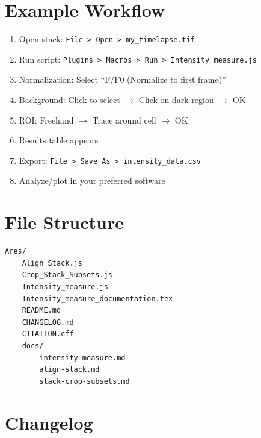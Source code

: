 \documentclass[11pt,a4paper]{article}
\begin{document}
\section{Example Workflow}

\begin{enumerate}
    \item Open stack: \texttt{File > Open > my\_timelapse.tif}
    \item Run script: \texttt{Plugins > Macros > Run > Intensity\_measure.js}
    \item Normalization: Select ``F/F0 (Normalize to first frame)''
    \item Background: Click to select $\rightarrow$ Click on dark region $\rightarrow$ OK
    \item ROI: Freehand $\rightarrow$ Trace around cell $\rightarrow$ OK
    \item Results table appears
    \item Export: \texttt{File > Save As > intensity\_data.csv}
    \item Analyze/plot in your preferred software
\end{enumerate}

\section{File Structure}

\begin{lstlisting}[language={},numbers=none]
Ares/
    Align_Stack.js
    Crop_Stack_Subsets.js
    Intensity_measure.js
    Intensity_measure_documentation.tex
    README.md
    CHANGELOG.md
    CITATION.cff
    docs/
        intensity-measure.md
        align-stack.md
        stack-crop-subsets.md
\end{lstlisting}

\section{Changelog}
\end{document}
